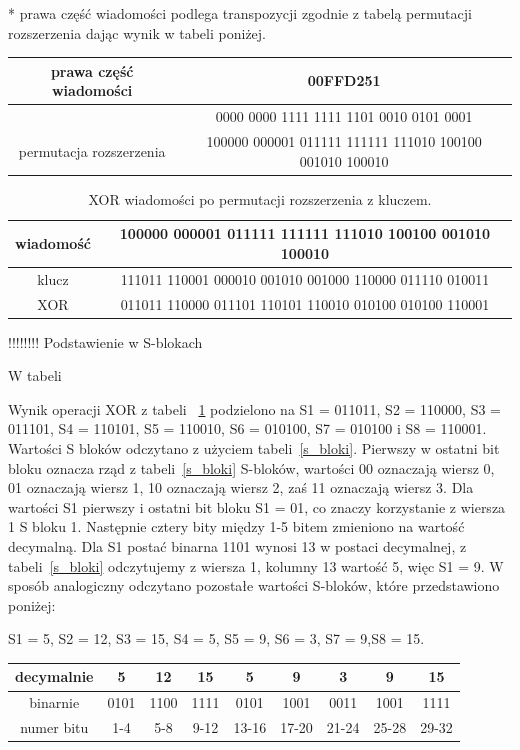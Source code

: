 \documentclass[12p]{article}
\begin{document}
* prawa część wiadomości podlega transpozycji zgodnie z tabelą permutacji rozszerzenia dając wynik w tabeli poniżej.
\begin{table}[H]
\begin{tabular}{|c|c|}
\hline
prawa część wiadomości & 00FFD251\\ \hline
& 0000 0000 1111 1111 1101 0010 0101 0001\\ \hline
permutacja rozszerzenia & 100000 000001 011111 111111 111010 100100 001010 100010\\ \hline
\end{tabular}
\end{table}


\begin{table}[H]
\begin{tabular}{|c|c|}
\hline
wiadomość & 100000 000001 011111 111111 111010 100100 001010 100010\\ \hline
klucz & 111011 110001 000010 001010 001000 110000 011110 010011\\ \hline
XOR & 011011 110000 011101 110101 110010 010100 010100 110001\\ 
\hline
\end{tabular}
\caption{XOR wiadomości po permutacji rozszerzenia z kluczem.}\label{xor}
\end{table}

!!!!!!!! Podstawienie w S-blokach

W tabeli

Wynik operacji XOR z tabeli ~\ref{xor} podzielono na S1 = 011011, S2 = 110000, S3 = 011101, S4 = 110101, S5 = 110010, S6 = 010100, S7 = 010100 i S8 = 110001. Wartości S bloków odczytano z użyciem tabeli~\ref{s_bloki}. Pierwszy w ostatni bit bloku oznacza rząd z tabeli~\ref{s_bloki} S-bloków, wartości 00 oznaczają wiersz 0, 01 oznaczają wiersz 1, 10 oznaczają wiersz 2, zaś 11 oznaczają wiersz 3. Dla wartości S1 pierwszy i ostatni bit bloku S1 = 01, co znaczy korzystanie z wiersza 1 S bloku 1. Następnie cztery bity między 1-5 bitem zmieniono na wartość decymalną. Dla S1 postać binarna 1101 wynosi 13 w postaci decymalnej, z tabeli~\ref{s_bloki} odczytujemy z wiersza 1, kolumny 13 wartość  5, więc S1 = 9. W sposób analogiczny odczytano pozostałe wartości S-bloków, które przedstawiono poniżej:
 
S1 = 5, S2 = 12, S3 = 15, S4 = 5, S5 = 9, S6 = 3, S7 = 9,S8 = 15.

\begin{table}[H]
\centering
\begin{tabular}{|c|c|c|c|c|c|c|c|c|} 
\hline
decymalnie &5 &12& 15& 5& 9& 3& 9& 15\\ \hline
binarnie & 0101& 1100& 1111& 0101& 1001& 0011& 1001& 1111\\ \hline
numer bitu &1-4 &5-8& 9-12& 13-16& 17-20& 21-24& 25-28& 29-32\\ \hline
\end{tabular}
\end{table}
\end{document}
